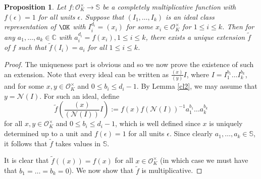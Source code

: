 \documentclass[11pt]{amsart}
\newtheorem{proposition}[lemma]{Proposition}
\theoremstyle{definition}
\newcommand{\C}{{\mathbb C}}
\newcommand{\NN}{{\mathcal N}}
\renewcommand{\S}{\mathbb{S}}
\newcommand{\e}{\epsilon}
\begin{document}
\begin{proposition}\label{prop: extensions}
    Let $f\colon \mathcal{O}_K^{\times}\to\S$ be a completely multiplicative function  with $f(\e)=1$ for all units $\e$. Suppose that %
    $(I_{1},\dots,I_{k})$ is an ideal class representation of $\OK$ %
 with
 $I_{i}^{d_{i}}=(x_{i})$ for some  $x_{i}\in \mathcal{O}_{K}^{\times}$ for  $1\leq i\leq k$. Then for any $a_{1},\dots,a_{k}\in\C$ with $a_{i}^{d_{i}}=f(x_{i}), 1\leq i\leq k$, there exists a unique extension $\tilde{f}$ of $f$ such that $\tilde{f}(I_{i})=a_{i}$ for all $1\leq i\leq k$. 
\end{proposition}
\begin{proof} %
The uniqueness part is obvious and so we now prove the existence of such an extension. Note that every ideal can be written as $\frac{(x)}{(y)}I$, where $I=I_{1}^{b_{1}}\dots I_{k}^{b_{k}}$, and for some $x,y\in \mathcal{O}_K^{\times}$ and $0\leq b_{i}\leq d_{i}-1$. 
By   Lemma \ref{cl2}, we may assume that $y=\NN(I)$. For such an ideal,
define
    $$\tilde{f}\left(\frac{(x)}{(\NN(I))}I\right):=f(x)f(\NN(I))^{-1}a_{1}^{b_{1}}\dots a_{k}^{b_{k}}$$
for all $x,y\in \mathcal{O}_K^{\times}$ and $0\leq b_{i}\leq d_{i}-1$, which is well defined since $x$ is uniquely determined up to a unit and $f(\e)=1$ for all units $\e$. %
Since clearly $a_{1},\dots,a_{k}\in\S$, it follows that $\tilde{f}$ takes values in $\S$.

It is clear that $\tilde{f}((x))=f(x)$ for all $x\in \mathcal{O}_K^{\times}$ (in which case we must have that $b_{1}=\dots=b_{k}=0$). 
We now show that $\tilde{f}$ is multiplicative.


\end{proof}
\end{document}
